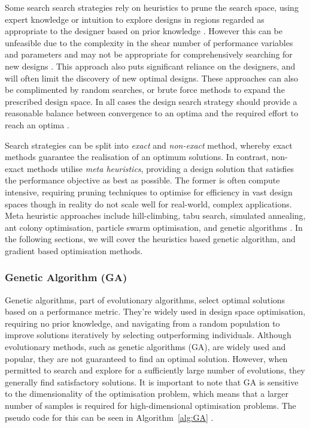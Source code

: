 \documentclass{article}
\begin{document}
Some search search strategies rely on heuristics to prune the search space, using expert knowledge or intuition to explore designs in regions regarded as appropriate to the designer based on prior knowledge \citep{Nardi2018}. However this can be unfeasible due to the complexity in the shear number of performance variables and parameters and may not be appropriate for comprehensively searching for new designs \citep{Zheng2023}. This approach also puts significant reliance on the designers, and will often limit the discovery of new optimal designs. These approaches can also be complimented by random searches, or brute force methods \citep{Huang2022} to expand the prescribed design space. In all cases the design search strategy should provide a reasonable balance between convergence to an optima and the required effort to reach an optima \citep{Pimentel2022}.

Search strategies can be split into \textit{exact} and \textit{non-exact} method, whereby exact methods guarantee the realisation of an optimum solutions. In contrast, non-exact methods utilise \textit{meta heuristics}, providing a design solution that satisfies the performance objective as best as possible. The former is often compute intensive, requiring pruning techniques to optimise for efficiency in vast design spaces though in reality do not scale well for real-world, complex applications. Meta heuristic approaches include hill-climbing, tabu search, simulated annealing, ant colony optimisation, particle swarm optimisation, and genetic algorithms \citep{Panerati2016}. In the following sections, we will cover the heuristics based genetic algorithm, and gradient based optimisation methods.

\subsubsection{Genetic Algorithm (GA)}\label{GA}
Genetic algorithms, part of evolutionary algorithms, select optimal solutions based on a performance metric. They’re widely used in design space optimisation, requiring no prior knowledge, and navigating from a random population to improve solutions iteratively \citep{Panerati2016} by selecting outperforming individuals. Although evolutionary methods, such as genetic algorithms (GA), are widely used and popular, they are not guaranteed to find an optimal solution. However, when permitted to search and explore for a sufficiently large number of evolutions, they generally find satisfactory solutions. It is important to note that GA is sensitive to the dimensionality of the optimisation problem, which means that a larger number of samples is required for high-dimensional optimisation problems.  The pseudo code for this can be seen in Algorithm~\ref{alg:GA} \citep{Sivanandam2008}. 
\end{document}
